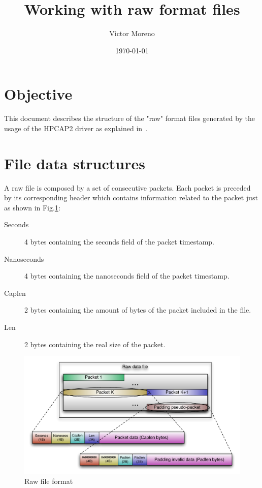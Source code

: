 \documentclass{article}
\title{Working with raw format files} %
\author{Victor Moreno} %
\date{\today} %
\begin{document}
\maketitle %


\section{Objective}

This document describes the structure of the "raw" format files generated by the usage of the HPCAP2 driver as explained in~\cite{MorenoTFM2012}.





\section{File data structures}

A raw file is composed by a set of consecutive packets.
Each packet is preceded by its corresponding header which contains information related to the packet just as shown in Fig.\ref{Fig:rawformat}:

\begin{description}
	\item[Seconds] 4 bytes containing the seconds field of the packet timestamp.
	\item[Nanoseconds] 4 bytes containing the nanoseconds field of the packet timestamp.
	\item[Caplen] 2 bytes containing the amount of bytes of the packet included in the file.
	\item[Len] 2 bytes containing the real size of the packet.
\end{description}


\begin{figure}[h]
	\centering
	\begin{center}
		\includegraphics[angle=90,width=.9\textwidth]{figs/buff_raw2.pdf}
		\caption{Raw file format}
		\label{Fig:rawformat}
	\end{center}
\end{figure}
\end{document}

